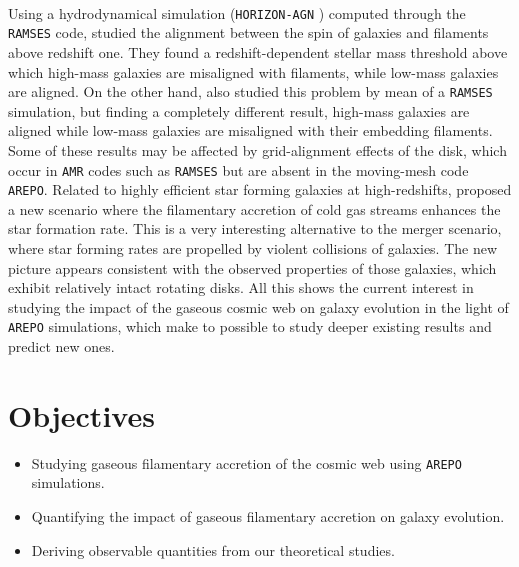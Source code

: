 \documentclass[a4,useAMS,usenatbib,usegraphicx,12pt]{article}
\begin{document}
\

Using a hydrodynamical simulation (\footnotesize{\texttt{HORIZON-AGN}}
\normalsize) computed through the \texttt{RAMSES} code, \citet{Dubois14} 
studied the alignment between the spin of galaxies and filaments above redshift
one. They found a redshift-dependent stellar mass threshold above which 
high-mass galaxies are misaligned with filaments, while low-mass galaxies are 
aligned. On the other hand, \citet{Hahn10} also studied this problem by mean of 
a \texttt{RAMSES} simulation, but finding a completely different result, 
high-mass galaxies are aligned while low-mass galaxies are misaligned with 
their embedding filaments. Some of these results may be affected by grid-alignment
effects of the disk, which occur in \texttt{AMR} codes such as \texttt{RAMSES}
but are absent in the moving-mesh code \texttt{AREPO}. Related to highly efficient 
star forming galaxies at high-redshifts, \citet{Dekel09} proposed a new scenario 
where the filamentary accretion of cold gas streams enhances the star formation 
rate. This is a very interesting alternative to the merger scenario, where star 
forming rates are propelled by violent collisions of galaxies. The new picture 
appears consistent with the observed properties of those galaxies, which exhibit
relatively intact rotating disks. All this shows the current interest in 
studying the impact of the gaseous cosmic web on galaxy evolution in the light 
of \texttt{AREPO} simulations, which make to possible to study 
deeper existing results and predict new ones.





\newpage
\section{Objectives}


\begin{itemize}

\item[\checkmark] Studying gaseous filamentary accretion of the cosmic web using 
\texttt{AREPO} simulations.

\item[\checkmark] Quantifying the impact of gaseous filamentary accretion on 
galaxy evolution.

\item[\checkmark] Deriving observable quantities from our theoretical studies.


\end{itemize}
\end{document}
